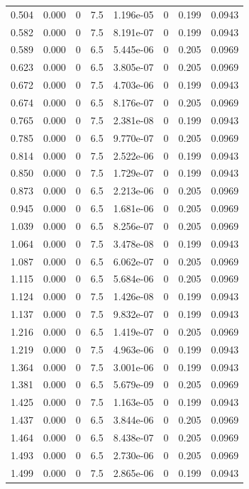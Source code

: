 \documentclass[preview]{standalone}
\begin{document}
{{\begin{tabular}{L{1.2cm}C{1.2cm} C{0.3cm}C{0.5cm} C{1.4cm}C{1.4cm} C{1.4cm}C{1.4cm}}
  0.504  &  0.000  & 0     & 7.5 &  1.196e-05  & 0  & 0.199 &  0.0943   \\ 
  0.582  &  0.000  & 0     & 7.5 &  8.191e-07  & 0  & 0.199 &  0.0943   \\ 
  0.589  &  0.000  & 0     & 6.5 &  5.445e-06  & 0  & 0.205 &  0.0969   \\ 
  0.623  &  0.000  & 0     & 6.5 &  3.805e-07  & 0  & 0.205 &  0.0969   \\ 
  0.672  &  0.000  & 0     & 7.5 &  4.703e-06  & 0  & 0.199 &  0.0943   \\ 
  0.674  &  0.000  & 0     & 6.5 &  8.176e-07  & 0  & 0.205 &  0.0969   \\ 
  0.765  &  0.000  & 0     & 7.5 &  2.381e-08  & 0  & 0.199 &  0.0943   \\ 
  0.785  &  0.000  & 0     & 6.5 &  9.770e-07  & 0  & 0.205 &  0.0969   \\ 
  0.814  &  0.000  & 0     & 7.5 &  2.522e-06  & 0  & 0.199 &  0.0943   \\ 
  0.850  &  0.000  & 0     & 7.5 &  1.729e-07  & 0  & 0.199 &  0.0943   \\ 
  0.873  &  0.000  & 0     & 6.5 &  2.213e-06  & 0  & 0.205 &  0.0969   \\ 
  0.945  &  0.000  & 0     & 6.5 &  1.681e-06  & 0  & 0.205 &  0.0969   \\ 
  1.039  &  0.000  & 0     & 6.5 &  8.256e-07  & 0  & 0.205 &  0.0969   \\ 
  1.064  &  0.000  & 0     & 7.5 &  3.478e-08  & 0  & 0.199 &  0.0943   \\ 
  1.087  &  0.000  & 0     & 6.5 &  6.062e-07  & 0  & 0.205 &  0.0969   \\ 
  1.115  &  0.000  & 0     & 6.5 &  5.684e-06  & 0  & 0.205 &  0.0969   \\ 
  1.124  &  0.000  & 0     & 7.5 &  1.426e-08  & 0  & 0.199 &  0.0943   \\ 
  1.137  &  0.000  & 0     & 7.5 &  9.832e-07  & 0  & 0.199 &  0.0943   \\ 
  1.216  &  0.000  & 0     & 6.5 &  1.419e-07  & 0  & 0.205 &  0.0969   \\ 
  1.219  &  0.000  & 0     & 7.5 &  4.963e-06  & 0  & 0.199 &  0.0943   \\ 
  1.364  &  0.000  & 0     & 7.5 &  3.001e-06  & 0  & 0.199 &  0.0943   \\ 
  1.381  &  0.000  & 0     & 6.5 &  5.679e-09  & 0  & 0.205 &  0.0969   \\ 
  1.425  &  0.000  & 0     & 7.5 &  1.163e-05  & 0  & 0.199 &  0.0943   \\ 
  1.437  &  0.000  & 0     & 6.5 &  3.844e-06  & 0  & 0.205 &  0.0969   \\ 
  1.464  &  0.000  & 0     & 6.5 &  8.438e-07  & 0  & 0.205 &  0.0969   \\ 
  1.493  &  0.000  & 0     & 6.5 &  2.730e-06  & 0  & 0.205 &  0.0969   \\ 
  1.499  &  0.000  & 0     & 7.5 &  2.865e-06  & 0  & 0.199 &  0.0943   \\ 
\hline 
\end{tabular} 

}}
\end{document}
